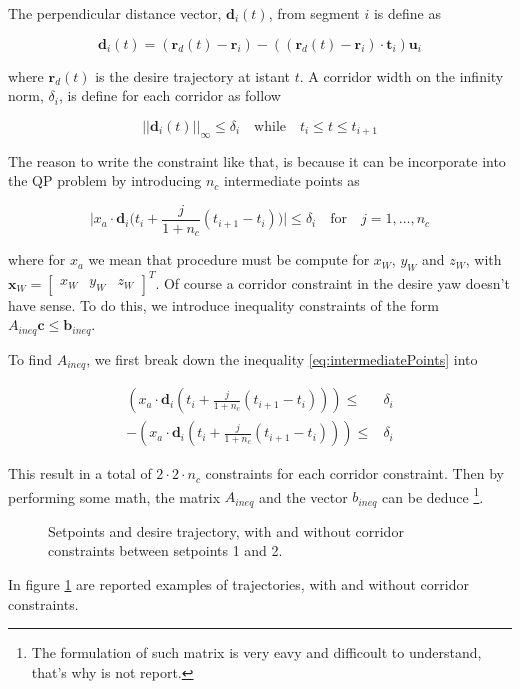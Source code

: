 \noindent The perpendicular distance vector, $\mathbf{d}_i(t)$, from segment $i$ is define as

\begin{equation}
	\mathbf{d}_i(t) = (\mathbf{r}_d(t)-\mathbf{r}_i)-((\mathbf{r}_d(t)-\mathbf{r}_i)\cdot\mathbf{t}_i)\mathbf{u}_i		
	\label{eq:perpendicularVector}	
\end{equation}

\noindent where $\mathbf{r}_d(t)$ is the desire trajectory at istant $t$. A corridor width on the infinity norm, $\delta_{i}$, is define for each corridor as follow

\begin{equation}
	\big|\big|\mathbf{d}_i(t)\big|\big|_{\infty}\le\delta_i \quad \text{while} \quad t_i\le t\le t_{i+1}
	\label{eq:corridorWidth}
\end{equation}

\noindent The reason to write the constraint like that, is because it can be incorporate into the QP problem by introducing $n_c$ intermediate points as

\begin{equation}
	\Bigg|x_a\cdot\mathbf{d}_i\Big(t_i+\frac{j}{1+n_c}(t_{i+1}-t_i)\Big)\Bigg|\le\delta_i \quad \text{for} \quad j=1,\dots,n_c
	\label{eq:intermediatePoints}
\end{equation}

\noindent where for $x_a$ we mean that procedure must be compute for $x_W$, $y_W$ and $z_W$, with $\mathbf{x}_W=\begin{bmatrix}x_W & y_W & z_W\end{bmatrix}^T$. Of course a corridor constraint in the desire yaw doesn't have sense. To do this, we introduce inequality constraints of the form $A_{ineq}\mathbf{c}\le \mathbf{b}_{ineq}$. 

\noindent To find $A_{ineq}$, we first break down the inequality \eqref{eq:intermediatePoints} into

\begin{align}
	(x_a\cdot\mathbf{d}_i(t_i+\frac{j}{1+n_c}(t_{i+1}-t_i)))\le & \delta_i \\
	-(x_a\cdot\mathbf{d}_i(t_i+\frac{j}{1+n_c}(t_{i+1}-t_i)))\le & \delta_i
	\label{eq:breakConstraint}
\end{align}

\noindent This result in a total of $2\cdot2\cdot n_c$ constraints for each corridor constraint. Then by performing some math, the matrix $A_{ineq}$ and the vector $b_{ineq}$ can be deduce \footnote{The formulation of such matrix is very eavy and difficoult to understand, that's why is not report.}.

\begin{figure}[h]
	\centering
 	
 	\caption{Setpoints and desire trajectory, with and without corridor constraints between setpoints 1 and 2.}
 	\label{fig:trajectory}		
\end{figure}

\noindent In figure \ref{fig:trajectory} are reported examples of trajectories, with and without corridor constraints.
